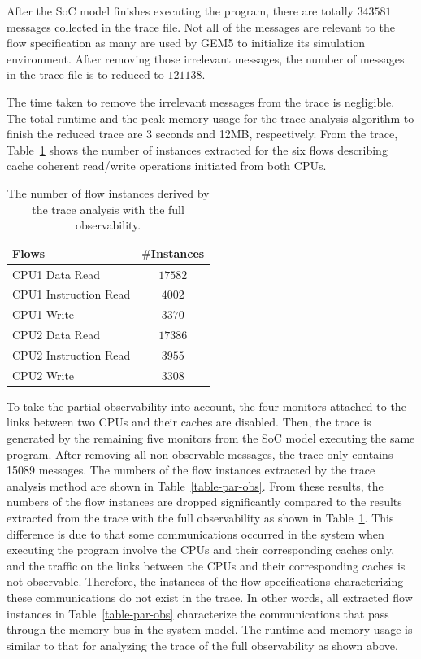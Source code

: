 \documentclass[conference]{IEEEtran}
\begin{document}
After the SoC model finishes executing the program, there
are totally $343581$ messages collected in the trace file.
Not all of the messages are relevant to the flow
specification as many are used by GEM5 to initialize its
simulation environment.  After removing those irrelevant
messages, the number of messages in the trace file is to
reduced to $121138$.

The time taken to remove the irrelevant messages from the
trace is negligible.  The total runtime and the peak memory
usage for the trace analysis algorithm to finish the reduced
trace are 3 seconds and 12MB, respectively.  From the trace,
Table~\ref{table-case-2} shows the number of instances
extracted for the six flows describing cache coherent
read/write operations initiated from both CPUs.
\begin{table}[tb]
\caption{The number of flow instances derived by the trace analysis with the full observability.}
\begin{center}
\begin{tabular}{|l|c|}
\hline
Flows & $\#$Instances \\
\hline
\hline
CPU1 Data Read			&  $17582$\\
CPU1 Instruction Read		&  $4002$\\
CPU1 Write				&  $3370$\\
\hline
CPU2 Data Read			&  $17386$\\
CPU2 Instruction Read		&  $3955$\\
CPU2 Write				&  $3308$\\
\hline
\end{tabular}
\end{center}
\label{table-case-2}
\end{table}%

To take the partial observability into account, the four
monitors attached to the links between two CPUs and their
caches are disabled. Then, the trace is generated by the
remaining five monitors from the SoC model executing the
same program. After removing all non-observable messages,
the trace only contains 15089 messages. The numbers of the
flow instances extracted by the trace analysis method are
shown in Table~\ref{table-par-obs}.  From these results, the
numbers of the flow instances are dropped significantly
compared to the results extracted from the trace with the
full observability as shown in
Table~\ref{table-case-2}. This difference is due to that
some communications occurred in the system when executing
the program involve the CPUs and their corresponding caches
only, and the traffic on the links between the CPUs and
their corresponding caches is not observable. Therefore, the
instances of the flow specifications characterizing these
communications do not exist in the trace. In other words,
all extracted flow instances in Table~\ref{table-par-obs}
characterize the communications that pass through the memory
bus in the system model.  The runtime and memory usage is
similar to that for analyzing the trace of the full
observability as shown above.
\end{document}
